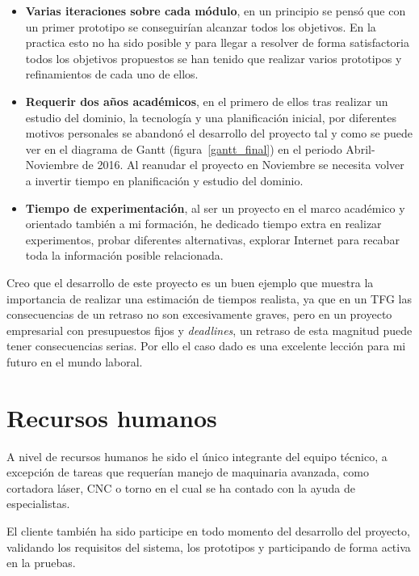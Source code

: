 \begin{itemize}
\begin{itemize}
\begin{itemize}
\begin{itemize}
	\item \textbf{Varias iteraciones sobre cada módulo}, en un principio se pensó que con un primer prototipo se conseguirían alcanzar todos los objetivos. En la practica esto no ha sido posible y para llegar a resolver de forma satisfactoria todos los objetivos propuestos se han tenido que realizar varios prototipos y refinamientos de cada uno de ellos.
	
	\item \textbf{Requerir dos años académicos}, en el primero de ellos tras realizar un estudio del dominio, la tecnología  y una planificación inicial, por diferentes motivos personales se abandonó el desarrollo del proyecto tal y como se puede ver en el diagrama de Gantt (figura~\ref{gantt_final}) en el periodo Abril-Noviembre de 2016. Al reanudar el proyecto en Noviembre se necesita volver a invertir tiempo en planificación y estudio del dominio.
	
	\item \textbf{Tiempo de experimentación}, al ser un proyecto en el marco académico y orientado también a mi formación, he dedicado tiempo extra en realizar experimentos, probar diferentes alternativas, explorar Internet para recabar toda la información posible relacionada.  
\end{itemize}

Creo que el desarrollo de este proyecto es un buen ejemplo que muestra la importancia de realizar una estimación de tiempos realista, ya que en un TFG las consecuencias de un retraso no son excesivamente graves, pero en un proyecto empresarial con presupuestos fijos y \textit{deadlines}, un retraso de esta magnitud puede tener consecuencias serias. Por ello el caso dado es una excelente lección para mi futuro en el mundo laboral.  

\section{Recursos humanos}

A nivel de recursos humanos he sido el único integrante del equipo técnico, a excepción de tareas que requerían manejo de maquinaria avanzada, como cortadora láser, CNC o torno en el cual se ha contado con la ayuda de especialistas. 

El cliente también ha sido participe en todo momento del desarrollo del proyecto, validando los requisitos del sistema, los prototipos y participando de forma activa en la pruebas. 


\end{itemize}
\end{itemize}
\end{itemize}
